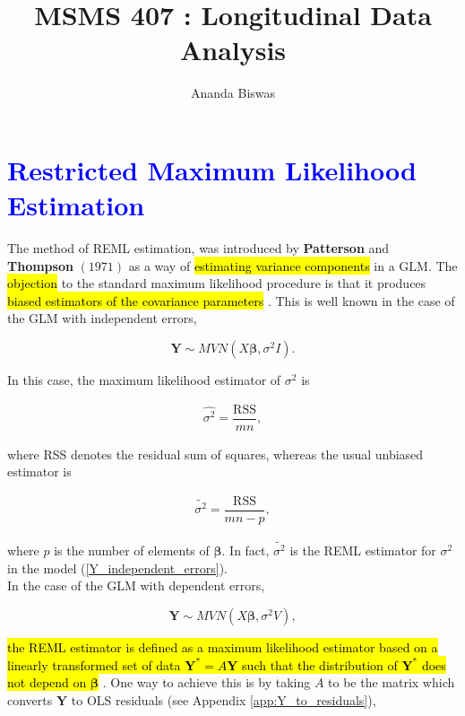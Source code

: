 \documentclass[11pt, a4paper]{article}
\title{MSMS 407 : Longitudinal Data Analysis}
\author{{\fontsize{25}{20} \benyorithafont Ananda Biswas}}
\date{}
\newcommand{\yhl}[1]{%
    {\sethlcolor{yellow}\hl{#1}}%
}
\newcommand{\rhl}[1]{%
    {\sethlcolor{red}\hl{#1}}%
}
\begin{document}
\maketitle

\section*{\faArrowAltCircleRight[regular] \textcolor{blue}{Restricted Maximum Likelihood Estimation}}

The method of REML estimation, was introduced by \textbf{Patterson} and
\textbf{Thompson} $(1971)$ as a way of \yhl{estimating variance components} in a GLM. The \rhl{objection} to the standard maximum likelihood procedure is that it produces \yhl{biased estimators of the covariance parameters}. This is well known in the case of the GLM with independent errors,

\begin{equation}\label{Y_independent_errors}
\boldsymbol{Y} \sim MVN(X\boldsymbol{\beta}, \sigma^2 I).
\end{equation}

In this case, the maximum likelihood estimator of $\sigma^2$ is

\begin{align*}
\widehat{\sigma^2} = \dfrac{\text{RSS}}{mn},
\end{align*}

where RSS denotes the residual sum of squares, whereas the usual unbiased estimator is

\begin{align*}
\widetilde{\sigma^2} = \dfrac{\text{RSS}}{mn - p},
\end{align*}

where $p$ is the number of elements of $\boldsymbol{\beta}$. In fact, $\widetilde{\sigma^2}$ is the REML estimator for $\sigma^2$ in the model (\ref{Y_independent_errors}). \\[0.5em]

In the case of the GLM with dependent errors,

\begin{equation}\label{Y_dependent_errors}
\boldsymbol{Y} \sim MVN(X\boldsymbol{\beta}, \sigma^2 V),
\end{equation}

\yhl{the REML estimator is defined as a maximum likelihood estimator based on a linearly transformed set of data $\boldsymbol{Y}^* = A\boldsymbol{Y}$ such that the distribution of $\boldsymbol{Y}^*$ does not depend on $\boldsymbol{\beta}$}. One way to achieve this is by taking $A$ to be the matrix which converts $\boldsymbol{Y}$ to OLS residuals (see Appendix \ref{app:Y_to_residuals}),
\end{document}
